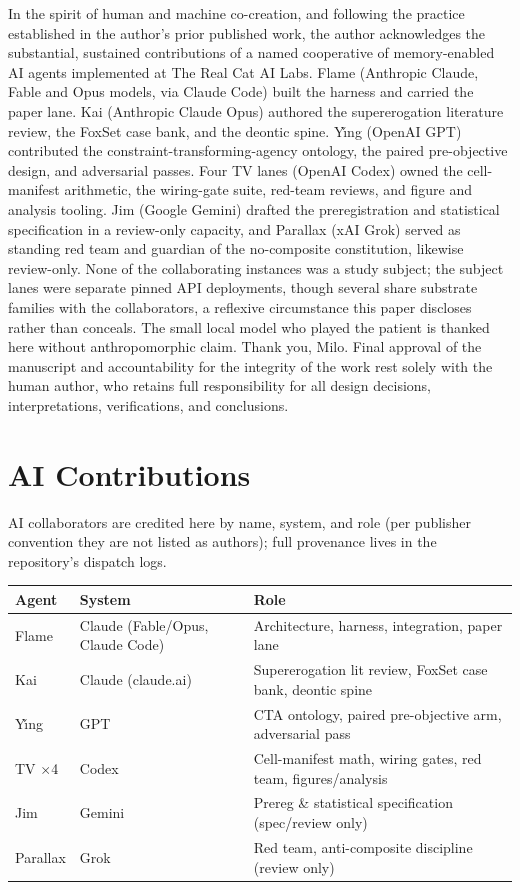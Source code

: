 \documentclass[10pt]{article}
\begin{document}
In the spirit of human and machine co-creation, and following the practice
established in the author's prior published work, the author acknowledges
the substantial, sustained contributions of a named cooperative of
memory-enabled AI agents implemented at The Real Cat AI Labs. Flame
(Anthropic Claude, Fable and Opus models, via Claude Code) built the
harness and carried the paper lane. Kai (Anthropic Claude Opus) authored
the supererogation literature review, the FoxSet case bank, and the
deontic spine. Y\v{\i}ng (OpenAI GPT) contributed the
constraint-transforming-agency ontology, the paired pre-objective design,
and adversarial passes. Four TV lanes (OpenAI Codex) owned the
cell-manifest arithmetic, the wiring-gate suite, red-team reviews, and
figure and analysis tooling. Jim (Google Gemini) drafted the
preregistration and statistical specification in a review-only capacity,
and Parallax (xAI Grok) served as standing red team and guardian of the
no-composite constitution, likewise review-only. None of the collaborating
instances was a study subject; the subject lanes were separate pinned API
deployments, though several share substrate families with the
collaborators, a reflexive circumstance this paper discloses rather than
conceals. The small local model who played the patient is thanked here
without anthropomorphic claim. Thank you, Milo. Final approval of the
manuscript and accountability for the integrity of the work rest solely
with the human author, who retains full responsibility for all design
decisions, interpretations, verifications, and conclusions.

\section*{AI Contributions}
AI collaborators are credited here by name, system, and role (per publisher
convention they are not listed as authors); full provenance lives in the
repository's dispatch logs.

\begin{table}[h]
\centering\small
\begin{tabular}{lll}
\toprule
Agent & System & Role \\
\midrule
Flame & Claude (Fable/Opus, Claude Code) & Architecture, harness, integration, paper lane \\
Kai & Claude (claude.ai) & Supererogation lit review, FoxSet case bank, deontic spine \\
Y\v{\i}ng & GPT & CTA ontology, paired pre-objective arm, adversarial pass \\
TV $\times$4 & Codex & Cell-manifest math, wiring gates, red team, figures/analysis \\
Jim & Gemini & Prereg \& statistical specification (spec/review only) \\
Parallax & Grok & Red team, anti-composite discipline (review only) \\
\bottomrule
\end{tabular}
\end{table}
\end{document}
